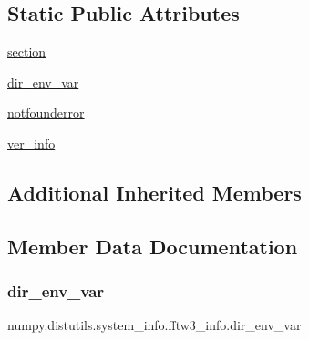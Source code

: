 \subsection*{Static Public Attributes}
\begin{DoxyCompactItemize}
\item 
\hyperlink{classnumpy_1_1distutils_1_1system__info_1_1fftw3__info_afa6f3017b6cad6a067810bd8814db2c8}{section}
\item 
\hyperlink{classnumpy_1_1distutils_1_1system__info_1_1fftw3__info_ac254696785fabe26517d3f504ee98438}{dir\+\_\+env\+\_\+var}
\item 
\hyperlink{classnumpy_1_1distutils_1_1system__info_1_1fftw3__info_a96c8727b48a479a8a15eb2781ec47212}{notfounderror}
\item 
\hyperlink{classnumpy_1_1distutils_1_1system__info_1_1fftw3__info_a62e06d974dd5a283dc2d7f9d8c298739}{ver\+\_\+info}
\end{DoxyCompactItemize}
\subsection*{Additional Inherited Members}


\subsection{Member Data Documentation}
\mbox{\label{classnumpy_1_1distutils_1_1system__info_1_1fftw3__info_ac254696785fabe26517d3f504ee98438}} 
\subsubsection{\texorpdfstring{dir\+\_\+env\+\_\+var}{dir\_env\_var}}
{\footnotesize\ttfamily numpy.\+distutils.\+system\+\_\+info.\+fftw3\+\_\+info.\+dir\+\_\+env\+\_\+var\hspace{0.3cm}{\ttfamily [static]}}

\mbox{\label{classnumpy_1_1distutils_1_1system__info_1_1fftw3__info_a96c8727b48a479a8a15eb2781ec47212}} 
